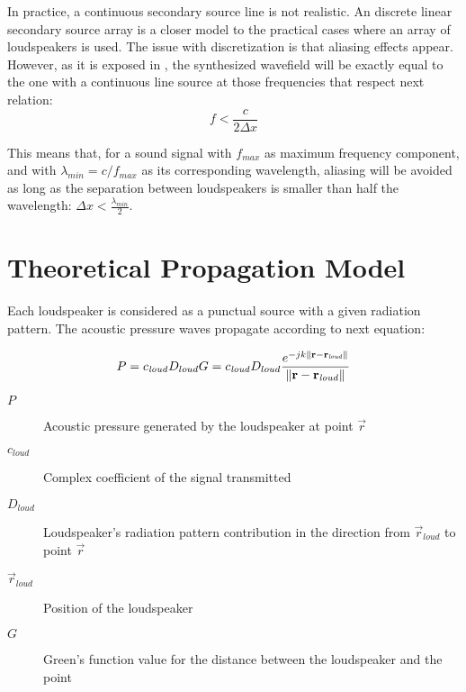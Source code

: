 In practice, a continuous secondary source line is not realistic. An discrete linear secondary source array is a closer model to the practical cases where an array of loudspeakers is used. The issue with discretization is that aliasing effects appear. However, as it is exposed in \cite{Start1997}, the synthesized wavefield will be exactly equal to the one with a continuous line source at those frequencies that respect next relation:
\begin{equation}
f < \frac{c}{2\Delta x}
\end{equation}

This means that, for a sound signal with $f_{max}$ as maximum frequency component, and with $\lambda_{min} = c/f_{max}$ as its corresponding wavelength, aliasing will be avoided as long as the separation between loudspeakers is smaller than half the wavelength: $\Delta x < \frac{\lambda_{min}}{2}$.

\section{Theoretical Propagation Model}
\label{TheoreticalModelLabel}

Each loudspeaker is considered as a punctual source with a given radiation pattern. The acoustic pressure waves propagate according to next equation:

\begin{equation}
P = c_\mathit{loud} D_{loud} G = c_\mathit{loud} D_{loud} \frac{e^{-j k \left\| \mathbf{r} - \mathbf{r}_\mathit{loud} \right\|}}{\left\| \mathbf{r} - \mathbf{r}_\mathit{loud} \right\|}
\end{equation}

\begin{description}
	\item[$P$] Acoustic pressure generated by the loudspeaker at point $\vec{r}$
	\item[$c_\mathit{loud}$] Complex coefficient of the signal transmitted %
	\item[$D_{loud}$] Loudspeaker's radiation pattern contribution in the direction from $\vec{r}_\mathit{loud}$ to point $\vec{r}$%
	\item[$\vec{r}_{\mathit{loud}}$] Position of the loudspeaker
	\item[$G$] Green's function value for the distance between the loudspeaker and the point %
\end{description}

